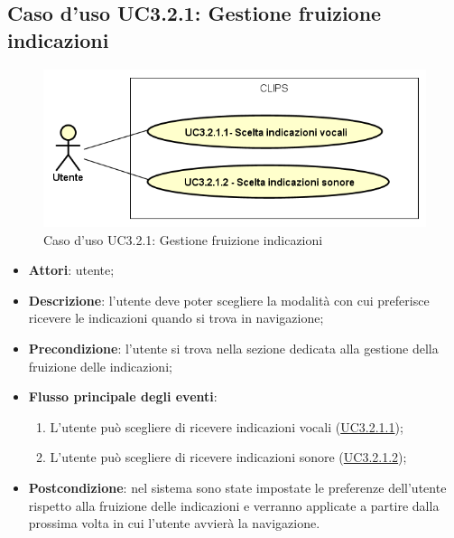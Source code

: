 \documentclass[../AnalisiDeiRequisiti.tex]{subfiles}
\begin{document}
\subsection{Caso d'uso UC3.2.1: Gestione fruizione indicazioni}

        \begin{figure}[!h]
            \centering
            \includegraphics[scale=0.95, width=\textwidth]{img/UC3-2-1.png}
            \caption{Caso d'uso UC3.2.1: Gestione fruizione indicazioni}\label{fig:UC3.2.1} 
        \end{figure}
\begin{itemize}
\item \textbf{Attori}: utente;
\item \textbf{Descrizione}: l'utente deve poter scegliere la modalità con cui preferisce ricevere le indicazioni quando si trova in navigazione; 
      \item \textbf{Precondizione}: l'utente si trova nella sezione dedicata alla gestione della fruizione delle indicazioni;

        \item \textbf{Flusso principale degli eventi}:
          \begin{enumerate}
          \item L'utente può scegliere di ricevere indicazioni vocali (\hyperlink{UC3.2.1.1}{UC3.2.1.1});
          \item L'utente può scegliere di ricevere indicazioni sonore (\hyperlink{UC3.2.1.2}{UC3.2.1.2});

      \end{enumerate}
    \item \textbf{Postcondizione}: nel sistema sono state impostate le preferenze dell'utente rispetto alla fruizione delle indicazioni e verranno applicate a partire dalla prossima volta in cui l'utente avvierà la navigazione.
  \end{itemize}
\hypertarget{UC3.2.1.1}{}
\end{document}

